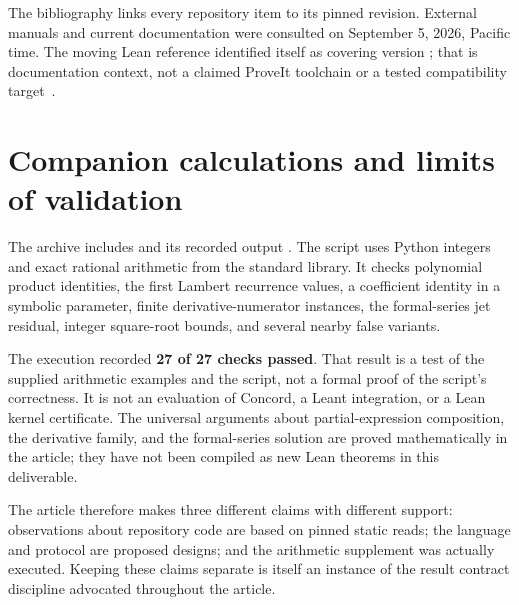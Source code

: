 \documentclass[11pt,a4paper]{article}
\newcommand{\code}[1]{\texttt{\detokenize{#1}}}
\theoremstyle{remark}
\begin{document}
The bibliography links every repository item to its pinned revision. External
manuals and current documentation were consulted on September 5, 2026, Pacific
time. The moving Lean reference identified itself as covering version
\code{4.34.0-rc2}; that is documentation context, not a claimed ProveIt toolchain
or a tested compatibility target~\cite{leanintro}.

\section{Companion calculations and limits of validation}
\label{app:checks}
The archive includes  and its recorded output
. The script uses Python integers and exact rational
arithmetic from the standard library. It checks polynomial product identities,
the first Lambert recurrence values, a coefficient identity in a symbolic
parameter, finite derivative-numerator instances, the formal-series jet residual,
integer square-root bounds, and several nearby false variants.

The execution recorded \textbf{27 of 27 checks passed}. That result is a test of
the supplied arithmetic examples and the script, not a formal proof of the
script's correctness. It is not an evaluation of Concord, a Leant integration,
or a Lean kernel certificate. The universal arguments about partial-expression
composition, the derivative family, and the formal-series solution are proved
mathematically in the article; they have not been compiled as new Lean theorems
in this deliverable.

The article therefore makes three different claims with different support:
observations about repository code are based on pinned static reads; the language
and protocol are proposed designs; and the arithmetic supplement was actually
executed. Keeping these claims separate is itself an instance of the result
contract discipline advocated throughout the article.
\end{document}
